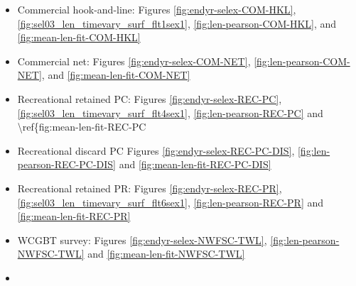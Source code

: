 \documentclass[11pt,
  english,
  a4paper,
]{article}
\begin{document}
\begin{itemize}
\item

  Commercial hook-and-line: Figures \ref{fig:endyr-selex-COM-HKL}, \ref{fig:sel03_len_timevary_surf_flt1sex1}, \ref{fig:len-pearson-COM-HKL}, and \ref{fig:mean-len-fit-COM-HKL}\\

  \tagmcend\tagstructend\tagstructend
\item

  Commercial net: Figures \ref{fig:endyr-selex-COM-NET}, \ref{fig:len-pearson-COM-NET}, and \ref{fig:mean-len-fit-COM-NET}

  \tagmcend\tagstructend\tagstructend
\item

  Recreational retained PC: Figures \ref{fig:endyr-selex-REC-PC}, \ref{fig:sel03_len_timevary_surf_flt4sex1}, \ref{fig:len-pearson-REC-PC} and \textbackslash ref\{fig:mean-len-fit-REC-PC

  \tagmcend\tagstructend\tagstructend
\item

  Recreational discard PC Figures \ref{fig:endyr-selex-REC-PC-DIS}, \ref{fig:len-pearson-REC-PC-DIS} and \ref{fig:mean-len-fit-REC-PC-DIS}

  \tagmcend\tagstructend\tagstructend
\item

  Recreational retained PR: Figures \ref{fig:endyr-selex-REC-PR}, \ref{fig:sel03_len_timevary_surf_flt6sex1}, \ref{fig:len-pearson-REC-PR} and \ref{fig:mean-len-fit-REC-PR}\\

  \tagmcend\tagstructend\tagstructend
\item

  WCGBT survey: Figures \ref{fig:endyr-selex-NWFSC-TWL}, \ref{fig:len-pearson-NWFSC-TWL} and \ref{fig:mean-len-fit-NWFSC-TWL}

  \tagmcend\tagstructend\tagstructend
\item


\end{itemize}
\end{document}
